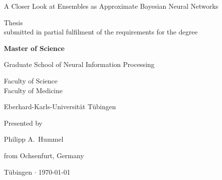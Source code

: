 \documentclass[11pt, A4, twoside, openright]{report}
\begin{document}
\begin{titlepage}
    \centering

    {\huge A Closer Look at Ensembles as Approximate Bayesian Neural Networks \par}

    \vspace{2cm}

    {\large Thesis\\submitted in partial fulfilment of the requirements for the degree \par}
    \vspace{0.25cm}
    {\large \textbf{Master of Science}\par}

    \vspace{3.5cm}

    {\large Graduate School of Neural Information Processing \par}
    \vspace{0.25cm}
    {\large Faculty of Science\\Faculty of Medicine \par}
    \vspace{0.25cm}
    {\large Eberhard-Karls-Universit\"at T\"ubingen \par}

    \vspace{3.5cm}

    {\large Presented by \par}
    \vspace{0.25cm}
    {\large Philipp A.\ Hummel \par}
    \vspace{0.25cm}
    {\large from Ochsenfurt, Germany \par}

    \vspace{1.5cm}

    {\large T\"ubingen $\cdot$ \today \par}
\end{titlepage}
\end{document}
